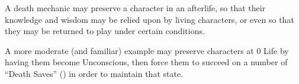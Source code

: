 \begin{Example}
  A death mechanic may preserve a character in an afterlife, 
  so that their knowledge and wisdom may be relied upon by living characters,
  or even so that they may be returned to play under certain conditions.

  \vspace{0.4em}

  A more moderate (and familiar) example may preserve characters at 0 Life
  by having them become Unconscious, then force them to succeed on a number of 
  ``Death Saves'' () in order to maintain that state.
\end{Example}


